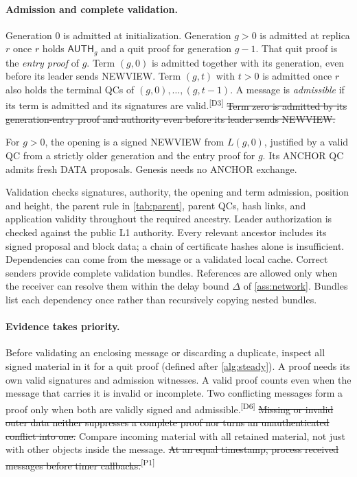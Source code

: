 \documentclass[11pt,a4paper]{article}
\newcommand{\NEW}[1]{{\color{diffNew}#1}}
\newcommand{\DEL}[1]{{\color{diffDel}\sout{#1}}}
\newcommand{\CH}[1]{\textsuperscript{\color{diffNew}\sffamily\scriptsize[#1]}}
\newcommand{\NEW}[1]{#1}
\newcommand{\DEL}[1]{}
\newcommand{\CH}[1]{}
\newcommand{\tagg}[1]{\ensuremath{\mathsf{#1}}}
\begin{document}
\paragraph{Admission and complete validation.}
\NEW{Generation $0$ is admitted at initialization. Generation $g>0$ is
admitted at replica $r$ once $r$ holds $\tagg{AUTH}_g$ and a quit proof for
generation $g-1$. That quit proof is the \emph{entry proof} of $g$. Term
$(g,0)$ is admitted together with its generation, even before its leader
sends NEWVIEW. Term $(g,t)$ with $t>0$ is admitted once $r$ also holds the
terminal QCs of $(g,0),\ldots,(g,t-1)$. A message is \emph{admissible} if
its term is admitted and its signatures are valid.}\CH{D3}
\DEL{Term zero is admitted by its generation-entry proof and authority even
before its leader sends NEWVIEW.}

For $g>0$, the opening is a signed NEWVIEW from $L(g,0)$, justified by
a valid QC from a strictly older generation and \NEW{the} entry proof for
$g$. Its ANCHOR QC admits fresh DATA proposals. Genesis needs no ANCHOR
exchange.

Validation checks signatures, authority, the opening and term admission,
position and height, the parent rule in \cref{tab:parent}, parent QCs,
hash links, and application validity throughout the required ancestry.
Leader authorization is checked against the public L1 authority.
Every relevant ancestor includes its signed proposal and block data;
a chain of certificate hashes alone is insufficient. Dependencies can
come from the message or a validated local cache. Correct senders provide
complete validation bundles. References are allowed only when the receiver
can resolve them within \NEW{the delay bound $\Delta$ of
\cref{ass:network}}. Bundles list each dependency once rather than
recursively copying nested bundles.

\paragraph{Evidence takes priority.}
Before validating an enclosing message or discarding a duplicate,
inspect \NEW{all signed material in it} for a quit proof\NEW{ (defined
after \cref{alg:steady})}. \NEW{A proof needs its own valid signatures and
admission witnesses. A valid proof counts even when the message that
carries it is invalid or incomplete. Two conflicting messages form a proof
only when both are validly signed and admissible.}\CH{D6}
\DEL{Missing or invalid outer data neither suppresses a complete proof nor
turns an unauthenticated conflict into one.} Compare incoming
\NEW{material} with \NEW{all} retained \NEW{material}, not just with other
objects inside the message. \DEL{At an equal timestamp, process received
messages before timer callbacks.}\CH{P1}
\end{document}
